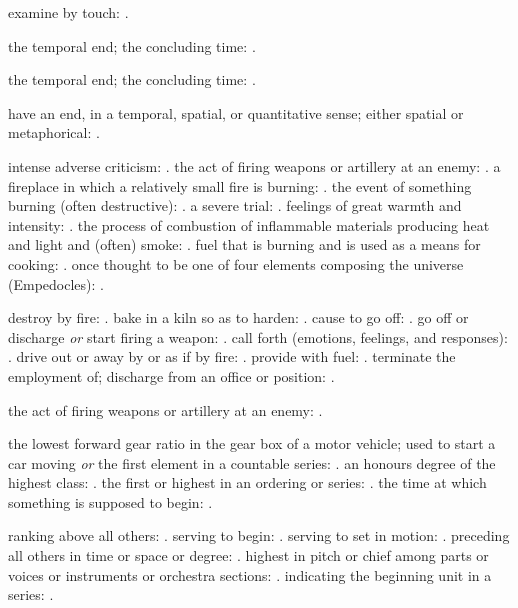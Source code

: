   examine by touch: .

  the temporal end; the concluding time: .

  the temporal end; the concluding time: .

  have an end, in a temporal, spatial, or quantitative sense; either spatial or metaphorical: .

  intense adverse criticism: . the act of firing weapons or artillery at an enemy: . a fireplace in which a relatively small fire is burning: . the event of something burning (often destructive): . a severe trial: . feelings of great warmth and intensity: . the process of combustion of inflammable materials producing heat and light and (often) smoke: . fuel that is burning and is used as a means for cooking: . once thought to be one of four elements composing the universe (Empedocles): .

  destroy by fire: . bake in a kiln so as to harden: . cause to go off: . go off or discharge \textit{or} start firing a weapon: . call forth (emotions, feelings, and responses): . drive out or away by or as if by fire: . provide with fuel: . terminate the employment of; discharge from an office or position: .

  the act of firing weapons or artillery at an enemy: .

  the lowest forward gear ratio in the gear box of a motor vehicle; used to start a car moving \textit{or} the first element in a countable series: . an honours degree of the highest class: . the first or highest in an ordering or series: . the time at which something is supposed to begin: .

  ranking above all others: . serving to begin: . serving to set in motion: . preceding all others in time or space or degree: . highest in pitch or chief among parts or voices or instruments or orchestra sections: . indicating the beginning unit in a series: .

